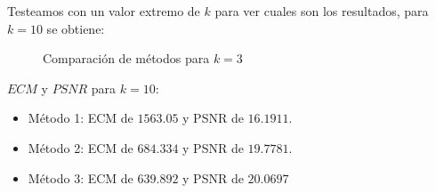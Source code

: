 Testeamos con un valor extremo de $k$ para ver cuales son los resultados, para $k=10$ se obtiene:

\begin{figure}[H]
    \centering
    \qquad
    \qquad
    \caption{Comparación de métodos para $k = 3$}%
    \label{fig:example}%
\end{figure}

$ECM$ y $PSNR$ para $k = 10$:

\begin{itemize}
 \item Método 1: ECM de $1563.05$ y PSNR de $16.1911$.
 \item Método 2: ECM de $684.334$ y PSNR de $19.7781$.
 \item Método 3: ECM de $639.892$ y PSNR de $20.0697$
\end{itemize}


